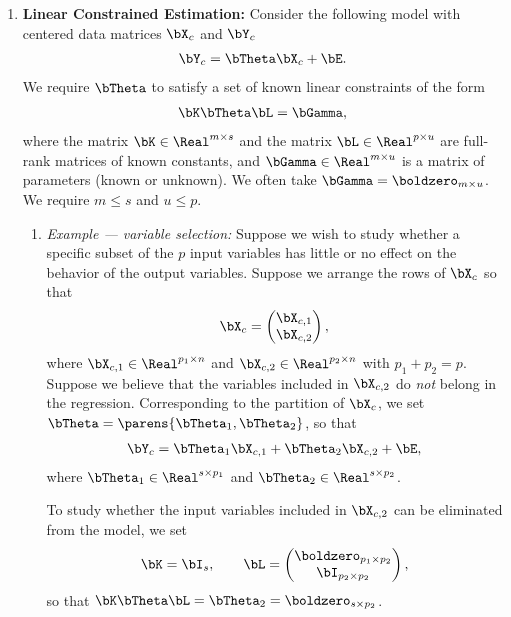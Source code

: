 \documentclass[12pt]{article}
\begin{document}
\begin{enumerate}[label=\textbf{\arabic*.}]
\begin{enumerate}
	\end{enumerate}
	
	\item \textbf{Linear Constrained Estimation:} Consider the following model with centered data matrices $\bX_c$ and $\bY_c$ 
	\begin{align*}
		\bY_c = \bTheta \bX_c + \bE. 
	\end{align*}
	We require $\bTheta$ to satisfy a set of known linear constraints of the form 
	\begin{align*}
		\bK \bTheta \bL = \bGamma, 
	\end{align*}
	where the matrix $\bK \in \Real^{m \times s}$ and the matrix $\bL \in \Real^{p \times u}$ are full-rank matrices of known constants, and $\bGamma \in \Real^{m \times u}$ is a matrix of parameters (known or unknown). We often take $\bGamma = \boldzero_{m \times u}$. We require $m \le s$ and $u \le p$. 
	
	\begin{enumerate}
		\item \textit{Example --- variable selection:} Suppose we wish to study whether a specific subset of the $p$ input variables has little or no effect on the behavior of the output variables. Suppose we arrange the rows of $\bX_c$ so that 
		\begin{align*}
			\bX_c = \begin{pmatrix}
				\bX_{c, 1} \\ 
				\bX_{c, 2}
			\end{pmatrix}, 
		\end{align*}
		where $\bX_{c,1} \in \Real^{p_1 \times n}$ and $\bX_{c,2} \in \Real^{p_2 \times n}$ with $p_1 + p_2 = p$. Suppose we believe that the variables included in $\bX_{c,2}$ do \emph{not} belong in the regression. Corresponding to the partition of $\bX_c$, we set $\bTheta = \parens{\bTheta_1, \bTheta_2}$, so that 
		\begin{align*}
			\bY_c = \bTheta_1 \bX_{c,1} + \bTheta_2 \bX_{c,2} + \bE, 
		\end{align*}
		where $\bTheta_1 \in \Real^{s \times p_1}$ and $\bTheta_2 \in \Real^{s \times p_2}$. 
		
		To study whether the input variables included in $\bX_{c,2}$ can be eliminated from the model, we set 
		\begin{align*}
			\bK = \bI_s, \qquad \bL = \begin{pmatrix}
				\boldzero_{p_1 \times p_2} \\ 
				\bI_{p_2 \times p_2}
			\end{pmatrix}, 
		\end{align*}
		so that $\bK \bTheta \bL = \bTheta_2 = \boldzero_{s \times p_2}$. 
		

\end{enumerate}
\end{enumerate}
\end{document}
